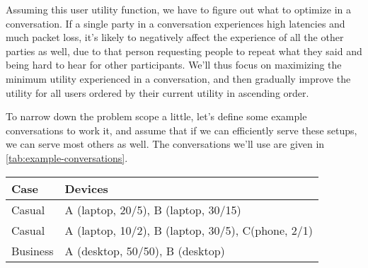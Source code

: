 Assuming this user utility function, we have to figure out what to optimize in a conversation. If a single party in a conversation experiences high latencies and much packet loss, it's likely to negatively affect the experience of all the other parties as well, due to that person requesting people to repeat what they said and being hard to hear for other participants. We'll thus focus on maximizing the minimum utility experienced in a conversation, and then gradually improve the utility for all users ordered by their current utility in ascending order.

To narrow down the problem scope a little, let's define some example conversations to work it, and assume that if we can efficiently serve these setups, we can serve most others as well. The conversations we'll use are given in \autoref{tab:example-conversations}.

\begin{center}
    \label{tab:example-conversations}
    \begin{tabular}{| l | l |}
    \hline
    \textbf{Case} & \textbf{Devices} \\ \hline
    Casual & A (laptop, 20/5), B (laptop, 30/15) \\ \hline
    Casual & A (laptop, 10/2), B (laptop, 30/5), C(phone, 2/1) \\ \hline
    Business & A (desktop, 50/50), B (desktop) \\ \hline
    \end{tabular}
\end{center}

